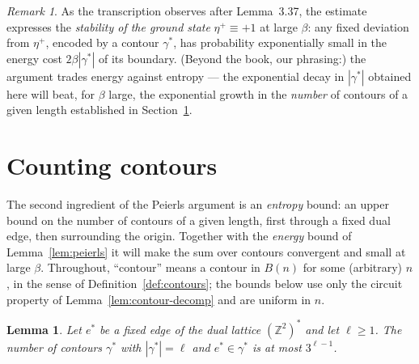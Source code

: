 \documentclass[11pt]{article}
\theoremstyle{plain}
\newtheorem{lemma}[theorem]{Lemma}
\theoremstyle{definition}
\theoremstyle{remark}
\newtheorem{remark}[theorem]{Remark}
\newcommand{\Z}{\mathbb{Z}}
\newcommand{\dualZ}{(\Z^2)^*}       %
\begin{document}
\begin{remark}
As the transcription observes after Lemma~3.37, the estimate expresses the
\emph{stability of the ground state} $\eta^+\equiv+1$ at large $\beta$: any
fixed deviation from $\eta^+$, encoded by a contour $\gamma^*$, has
probability exponentially small in the energy cost $2\beta|\gamma^*|$ of its
boundary. (Beyond the book, our phrasing:) the argument trades energy against
entropy --- the exponential decay in $|\gamma^*|$ obtained here will beat, for
$\beta$ large, the exponential growth in the \emph{number} of contours of a
given length established in Section~\ref{sec:counting}.
\end{remark}

\section{Counting contours}
\label{sec:counting}

The second ingredient of the Peierls argument is an \emph{entropy} bound: an
upper bound on the number of contours of a given length, first through a fixed
dual edge, then surrounding the origin. Together with the \emph{energy} bound
of Lemma~\ref{lem:peierls} it will make the sum over contours convergent and
small at large $\beta$. Throughout, ``contour'' means a contour in $B(n)$ for
some (arbitrary) $n$, in the sense of Definition~\ref{def:contours}; the
bounds below use only the circuit property of
Lemma~\ref{lem:contour-decomp} and are uniform in $n$.

\begin{lemma}
\label{lem:walkcount}
Let $e^*$ be a fixed edge of the dual lattice $\dualZ$ and let $\ell\ge1$.
The number of contours $\gamma^*$ with $|\gamma^*|=\ell$ and
$e^*\in\gamma^*$ is at most $3^{\ell-1}$.
\end{lemma}
\end{document}
